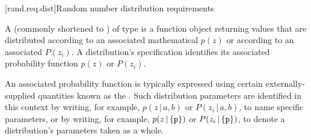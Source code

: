 
[rand.req.dist]{Random number distribution requirements}%
%

\pnum
A 
(commonly shortened to )
 of type 
is a function object
returning values
that are distributed according to
an associated mathematical 
$p(z)$
or according to
an associated 
$P(z_i)$.
A distribution's specification
identifies its associated probability function
$p(z)$ or $P(z_i)$.

\pnum
An associated probability function is typically expressed
using certain externally-supplied quantities
known as the .
Such distribution parameters are identified
in this context by writing, for example,
  $p(z\,|\,a,b)$ or $P(z_i\,|\,a,b)$,
  to name specific parameters,
or by writing, for example,
  $p(z\,|\left\{\texttt{p}\right\})$
  or $P(z_i\,|\left\{\texttt{p}\right\})$,
  to denote a distribution's parameters  taken as a whole.

